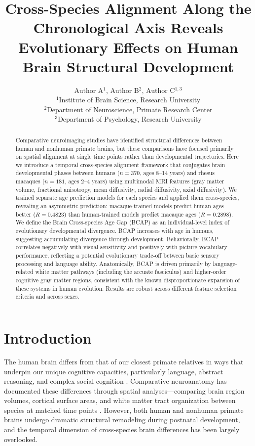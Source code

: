 \documentclass[12pt]{article}
\title{Cross-Species Alignment Along the Chronological Axis Reveals Evolutionary Effects on Human Brain Structural Development}
\author{Author A$^{1}$, Author B$^{2}$, Author C$^{1,3}$ \\
\small $^{1}$Institute of Brain Science, Research University \\
\small $^{2}$Department of Neuroscience, Primate Research Center \\
\small $^{3}$Department of Psychology, Research University}
\date{}
\begin{document}
\maketitle

\begin{abstract}
Comparative neuroimaging studies have identified structural differences between human and nonhuman primate brains, but these comparisons have focused primarily on spatial alignment at single time points rather than developmental trajectories. Here we introduce a temporal cross-species alignment framework that conjugates brain developmental phases between humans ($n = 370$, ages 8--14 years) and rhesus macaques ($n = 181$, ages 2--4 years) using multimodal MRI features (gray matter volume, fractional anisotropy, mean diffusivity, radial diffusivity, axial diffusivity). We trained separate age prediction models for each species and applied them cross-species, revealing an asymmetric prediction: macaque-trained models predict human ages better ($R = 0.4823$) than human-trained models predict macaque ages ($R = 0.2898$). We define the Brain Cross-species Age Gap (BCAP) as an individual-level index of evolutionary developmental divergence. BCAP increases with age in humans, suggesting accumulating divergence through development. Behaviorally, BCAP correlates negatively with visual sensitivity and positively with picture vocabulary performance, reflecting a potential evolutionary trade-off between basic sensory processing and language ability. Anatomically, BCAP is driven primarily by language-related white matter pathways (including the arcuate fasciculus) and higher-order cognitive gray matter regions, consistent with the known disproportionate expansion of these systems in human evolution. Results are robust across different feature selection criteria and across sexes.
\end{abstract}

\section{Introduction}

The human brain differs from that of our closest primate relatives in ways that underpin our unique cognitive capacities, particularly language, abstract reasoning, and complex social cognition \citep{hill2010similar}. Comparative neuroanatomy has documented these differences through spatial analyses---comparing brain region volumes, cortical surface areas, and white matter tract organization between species at matched time points \citep{rilling2008evolution}. However, both human and nonhuman primate brains undergo dramatic structural remodeling during postnatal development, and the temporal dimension of cross-species brain differences has been largely overlooked.
\end{document}
